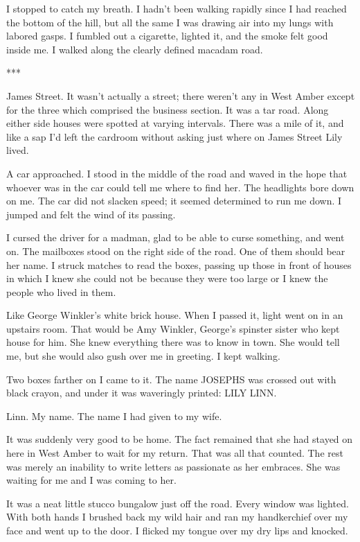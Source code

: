 \documentclass{novel}
\begin{document}
{I stopped to catch my breath. I hadn’t been walking rapidly since I had reached the bottom of the hill, but all the same I was drawing air into my lungs with labored gasps. I fumbled out a cigarette, lighted it, and the smoke felt good inside me. I walked along the clearly defined macadam road.

***

James Street. It wasn’t actually a street; there weren’t any in West Amber except for the three which comprised the business section. It was a tar road. Along either side houses were spotted at varying intervals. There was a mile of it, and like a sap I’d left the cardroom without asking just where on James Street Lily lived.

A car approached. I stood in the middle of the road and waved in the hope that whoever was in the car could tell me where to find her. The headlights bore down on me. The car did not slacken speed; it seemed determined to run me down. I jumped and felt the wind of its passing.

I cursed the driver for a madman, glad to be able to curse something, and went on. The mailboxes stood on the right side of the road. One of them should bear her name. I struck matches to read the boxes, passing up those in front of houses in which I knew she could not be because they were too large or I knew the people who lived in them.

Like George Winkler’s white brick house. When I passed it, light went on in an upstairs room. That would be Amy Winkler, George’s spinster sister who kept house for him. She knew everything there was to know in town. She would tell me, but she would also gush over me in greeting. I kept walking.

Two boxes farther on I came to it. The name JOSEPHS was crossed out with black crayon, and under it was waveringly printed: LILY LINN.

Linn. My name. The name I had given to my wife.

It was suddenly very good to be home. The fact remained that she had stayed on here in West Amber to wait for my return. That was all that counted. The rest was merely an inability to write letters as passionate as her embraces. She was waiting for me and I was coming to her.

It was a neat little stucco bungalow just off the road. Every window was lighted. With both hands I brushed back my wild hair and ran my handkerchief over my face and went up to the door. I flicked my tongue over my dry lips and knocked.

}
\end{document}

